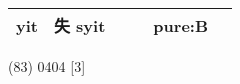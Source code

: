 \documentclass[14pt,a4paper]{scrartcl}
\begin{document}
\begin{longtable}[c]{@{}llllll@{}}
\begin{minipage}[t]{0.14\columnwidth}\raggedright\strut
yit
\strut\end{minipage} &
\begin{minipage}[t]{0.14\columnwidth}\raggedright\strut
失 syit
\strut\end{minipage} &
\begin{minipage}[t]{0.14\columnwidth}\raggedright\strut
\strut\end{minipage} &
\begin{minipage}[t]{0.14\columnwidth}\raggedright\strut
\strut\end{minipage} &
\begin{minipage}[t]{0.14\columnwidth}\raggedright\strut
pure:B
\strut\end{minipage}\tabularnewline
\bottomrule
\end{longtable}

(83) 0404 {[}3{]}
\end{document}
